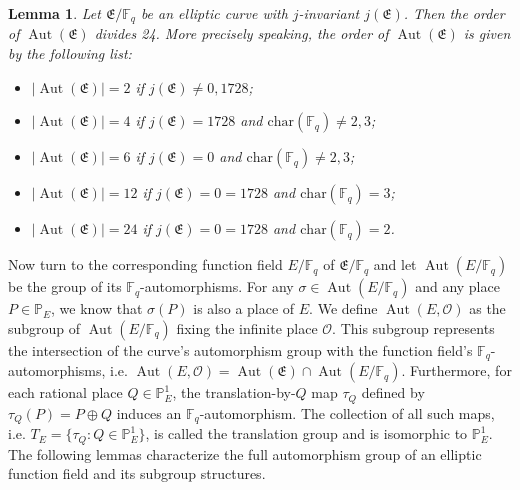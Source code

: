 \documentclass[journal,12pt,onecolumn]{IEEEtran}
\newtheorem{lemma}{Lemma}
\begin{document}
\begin{lemma}
    Let \( \mathfrak{E}/\mathbb{F}_q \) be an elliptic curve with \( j \)-invariant \( j(\mathfrak{E}) \). Then the order of \( \operatorname{Aut}(\mathfrak{E}) \) divides 24. More precisely speaking, the order of \( \operatorname{Aut}(\mathfrak{E}) \) is given by the following list:
    \begin{itemize}
        \item[(i)] \( |\operatorname{Aut}(\mathfrak{E})| = 2 \) if \( j(\mathfrak{E}) \neq 0, 1728 \);
        \item[(ii)] \( |\operatorname{Aut}(\mathfrak{E})| = 4 \) if \( j(\mathfrak{E}) = 1728 \) and \( \text{char}(\mathbb{F}_q) \neq 2, 3 \);
        \item[(iii)] \( |\operatorname{Aut}(\mathfrak{E})| = 6 \) if \( j(\mathfrak{E}) = 0 \) and \( \text{char}(\mathbb{F}_q) \neq 2, 3 \);
        \item[(iv)] \( |\operatorname{Aut}(\mathfrak{E})| = 12 \) if \( j(\mathfrak{E}) = 0 = 1728 \) and \( \text{char}(\mathbb{F}_q) = 3 \);
        \item[(v)] \( |\operatorname{Aut}(\mathfrak{E})| = 24 \) if \( j(\mathfrak{E}) = 0 = 1728 \) and \( \text{char}(\mathbb{F}_q) = 2 \).
    \end{itemize}
\end{lemma}

Now turn to the corresponding function field $E/\mathbb{F}_q$ of $\mathfrak{E}/\mathbb{F}_q$ and let $\operatorname{Aut}(E/\mathbb{F}_q)$ be the group of its $\mathbb{F}_q$-automorphisms. For any $\sigma \in \operatorname{Aut}(E/\mathbb{F}_q)$ and any place $P \in \mathbb{P}_E$, we know that $\sigma(P)$ is also a place of $E$\cite[Lem. 3.5.2]{Algebraic_Function_Fields_and_Codes}. We define $\operatorname{Aut}(E,\mathcal{O})$ as the subgroup of $\operatorname{Aut}(E/\mathbb{F}_q)$ fixing the infinite place $\mathcal{O}$. This subgroup represents the intersection of the curve's automorphism group with the function field's $\mathbb{F}_q$-automorphisms, i.e. $\operatorname{Aut}(E,\mathcal{O}) = \operatorname{Aut}(\mathfrak{E}) \cap \operatorname{Aut}(E/\mathbb{F}_q)$. Furthermore, for each rational place $Q \in \mathbb{P}_E^1$, the translation-by-$Q$ map $\tau_Q$ defined by $\tau_Q(P) = P \oplus Q$ induces an $\mathbb{F}_q$-automorphism. The collection of all such maps, i.e. $T_E = \{ \tau_Q:Q\in \mathbb{P}_E^1 \}$, is called the translation group and is isomorphic to $\mathbb{P}_E^1$. The following lemmas \cite[Thm. 3.1 and Prop. 3.2]{MA2023105686} characterize the full automorphism group of an elliptic function field and its subgroup structures.
\end{document}
